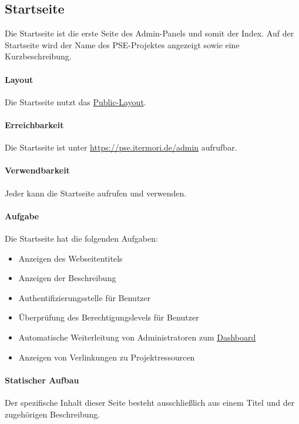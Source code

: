 \subsection{Startseite}\label{AP_Startseite}

Die Startseite ist die erste Seite des Admin-Panels und somit der Index.
Auf der Startseite wird der Name des PSE-Projektes angezeigt sowie eine Kurzbeschreibung.

\paragraph*{Layout}
Die Startseite nutzt das \hyperref[AP_Public_Layout]{Public-Layout}.

\paragraph*{Erreichbarkeit}
Die Startseite ist unter \href{https://pse.itermori.de/admin}{https://pse.itermori.de/admin} aufrufbar.

\paragraph*{Verwendbarkeit}
Jeder kann die Startseite aufrufen und verwenden.

\paragraph{Aufgabe}
Die Startseite hat die folgenden Aufgaben:
\begin{itemize}
    \item Anzeigen des Webseitentitels
    \item Anzeigen der Beschreibung
    \item Authentifizierungsstelle für Benutzer
    \item Überprüfung des Berechtigungslevels für Benutzer
    \item Automatische Weiterleitung von Administratoren zum \hyperref[AP_Dashboard]{Dashboard}
    \item Anzeigen von Verlinkungen zu Projektressourcen
\end{itemize}

\paragraph*{Statischer Aufbau}
Der spezifische Inhalt dieser Seite besteht ausschließlich aus einem Titel und der zugehörigen Beschreibung.

